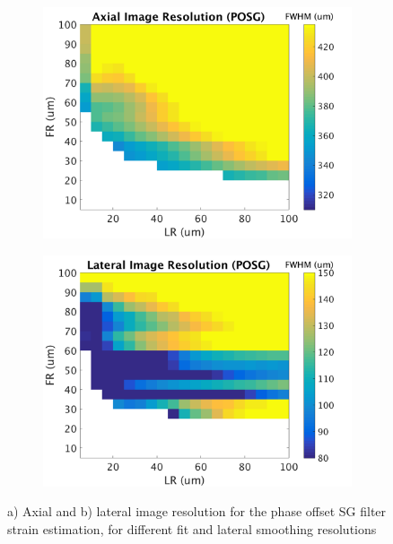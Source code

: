 \begin{figure}[h!]
	\centering
	\begin{subfigure}{0.49\textwidth}
		\centering
		\includegraphics[width=\textwidth]{appendix_figs/posg_axial_imageres.png}
	\end{subfigure}
	\begin{subfigure}{0.49\textwidth}
		\centering
		\includegraphics[width=\textwidth]{appendix_figs/posg_lateral_imageres.png}
	\end{subfigure}
	\caption{a) Axial and b) lateral image resolution for the phase offset SG filter strain estimation, for different fit and lateral smoothing resolutions}
	\label{posg_imageres}
\end{figure}


